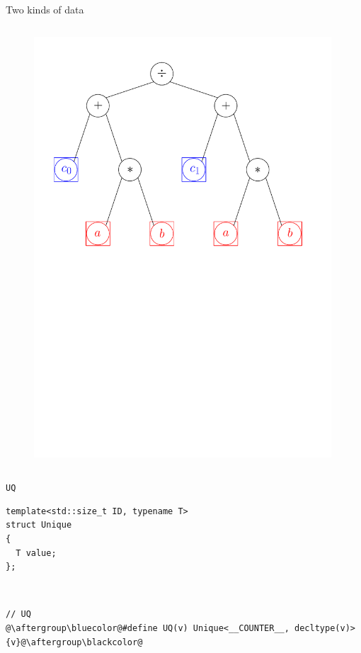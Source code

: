 \documentclass[xcolor=dvipsnames]{beamer}
\begin{document}
\begin{frame}[fragile]{Two kinds of data}
  \begin{columns}[T] %
    \begin{column}{0.75\textwidth}
      \begin{figure}[H]
        \centering
        \includegraphics[width=0.99\textwidth]{fig_exprtree_cb_rb}
      \end{figure}
    \end{column}%
  \end{columns}
\end{frame}


\begin{frame}[fragile]{\texttt{UQ}}
\begin{lstlisting}
template<std::size_t ID, typename T>
struct Unique
{
  T value;
};
\end{lstlisting}

~

\begin{lstlisting}
// UQ
@\aftergroup\bluecolor@#define UQ(v) Unique<__COUNTER__, decltype(v)>{v}@\aftergroup\blackcolor@
\end{lstlisting}
\end{frame}
\end{document}
